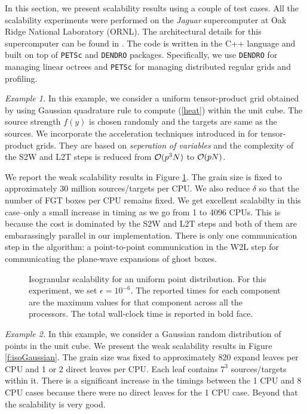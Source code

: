 
In this section, we present scalability results using a couple of test cases.  All the scalability experiments were performed 
on the {\it{Jaguar}} supercomputer at Oak Ridge National Laboratory (ORNL). The architectural details for this supercomputer
 can be found in \cite{jaguar}. The code is written in the C++ language and built on top of \texttt{PETSc} and \texttt{DENDRO} packages. 
 Specifically, we use \texttt{DENDRO} for managing linear octrees and \texttt{PETSc} for managing distributed regular grids and profiling. 

{\em Example 1.} In this example, we consider a uniform tensor-product grid obtained by using Gaussian quadrature rule to
 compute (\ref{heat}) within the unit cube. The source strength $f(y)$ is chosen randomly and the targets are same as the
  sources. We incorporate the acceleration techniques introduced in \cite{fggt} for tensor-product grids. They are based on 
{\em seperation of variables} and the complexity of the S2W and L2T steps is reduced from $\mathcal{O}(p^3 N)$ to $\mathcal{O}(p N)$. 

We report the weak scalability results in Figure \ref{f:isoUniform}. The grain size is fixed to approximately 30 million 
sources/targets per CPU. We also reduce $\delta$ so that the number of FGT boxes per CPU remains fixed. We get excellent
 scalabilty in this case--only a small increase in timing as we go from 1 to 4096 CPUs. This is  because the cost is dominated 
 by the S2W and L2T steps and both of them are embarassingly parallel in our implementation. There is only one communication 
 step in the algorithm: a point-to-point communication in the W2L step for communicating the plane-wave expansions of ghost boxes.

\begin{figure}
	\begin{center}
	
	\end{center}
\caption{\label{f:isoUniform} Isogranular scalability for an uniform point distribution. For
 this experiment, we set $\epsilon = 10^{-6}$. The reported times for 
each component are the maximum values for that component across all the processors. The total wall-clock
time is reported in bold face.} 
\end{figure}

{\em Example 2.} In this example, we consider a Gaussian random distribution of points in the unit cube. 
We present the weak scalability results in Figure \ref{f:isoGaussian}. The grain size was fixed to approximately
820 expand leaves per CPU and 1 or 2 direct leaves per CPU. Each leaf contains $7^3$ sources/targets within it. There 
is a significant increase in the timings between the 1 CPU and 8 CPU cases because there were no direct leaves for
the 1 CPU case. Beyond that the scalability is very good.

